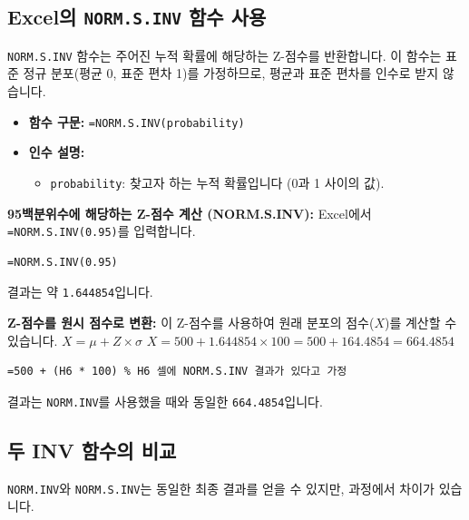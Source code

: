 \documentclass[11pt,a4paper]{book}
\theoremstyle{definition}
\begin{document}
\subsection{Excel의 \texttt{NORM.S.INV} 함수 사용}
\texttt{NORM.S.INV} 함수는 주어진 누적 확률에 해당하는 Z-점수를 반환합니다.
이 함수는 표준 정규 분포(평균 0, 표준 편차 1)를 가정하므로, 평균과 표준 편차를 인수로 받지 않습니다.

\begin{itemize}
    \item \textbf{함수 구문:} \texttt{=NORM.S.INV(probability)}
    \item \textbf{인수 설명:}
    \begin{itemize}
        \item \texttt{probability}: 찾고자 하는 누적 확률입니다 (0과 1 사이의 값).
    \end{itemize}
\end{itemize}

\begin{examplebox}
    \textbf{95백분위수에 해당하는 Z-점수 계산 (NORM.S.INV):}
    Excel에서 \texttt{=NORM.S.INV(0.95)}를 입력합니다.
    \begin{lstlisting}[language=Excel, caption={Excel에서 NORM.S.INV 함수 사용 예시}, label={lst:norm_s_inv_example}]
=NORM.S.INV(0.95)
    \end{lstlisting}
    결과는 약 \texttt{1.644854}입니다.

    \textbf{Z-점수를 원시 점수로 변환:}
    이 Z-점수를 사용하여 원래 분포의 점수($X$)를 계산할 수 있습니다.
    $X = \mu + Z \times \sigma$
    $X = 500 + 1.644854 \times 100 = 500 + 164.4854 = 664.4854$
    \begin{lstlisting}[language=Excel, caption={Z-점수를 원시 점수로 변환하는 Excel 수식}, label={lst:z_to_x_formula}]
=500 + (H6 * 100) % H6 셀에 NORM.S.INV 결과가 있다고 가정
    \end{lstlisting}
    결과는 \texttt{NORM.INV}를 사용했을 때와 동일한 \texttt{664.4854}입니다.
\end{examplebox}

\subsection{두 INV 함수의 비교}
\texttt{NORM.INV}와 \texttt{NORM.S.INV}는 동일한 최종 결과를 얻을 수 있지만, 과정에서 차이가 있습니다.
\end{document}
